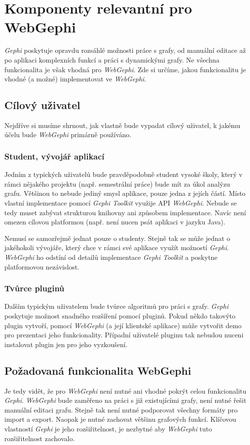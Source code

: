 \documentclass[thesis=M,czech]{FITthesis}[2014/05/6]
\begin{document}
\section{Komponenty relevantní pro WebGephi}
\textit{Gephi} poskytuje opravdu rozsáhlé možnosti práce s grafy, od manuální editace až po aplikaci komplexních funkcí a práci s dynamickými grafy.
Ne všechna funkcionalita je však vhodná pro \textit{WebGephi}. Zde si určíme, jakou funkcionalitu je vhodné (a možné) implementovat ve \textit{WebGephi}.

\subsection{Cílový uživatel}
Nejdříve si musíme shrnout, jak vlastně bude vypadat cílový uživatel, k jakému účelu bude \textit{WebGephi} primárně používáno.

\subsubsection{Student, vývojář aplikací}
Jedním z typických uživatelů bude pravděpodobně student vysoké školy, který v rámci nějakého projektu (např. semestrální práce) bude 
mít za úkol analýzu grafu. Většinou to nebude jediný smysl aplikace, pouze jedna z jejích částí. Místo vlastní implementace pomocí \textit{Gephi Toolkit}
využije API \textit{WebGephi}. Nebude se tedy muset zabývat strukturou knihovny ani způsobem implementace. Navíc není omezen
cílovou platformou (např. není nucen psát aplikaci v jazyku Java).

Nemusí se samozřejmě jednat pouze o studenty. Stejně tak se může jednat o jakéhokoli vývojáře, který chce v rámci své aplikace
využít možností \textit{Gephi}. \textit{WebGephi} ho odstíní od detailů implementace \textit{Gephi Toolkit} a poskytne platformovou nezávislost.

\subsubsection{Tvůrce pluginů}
Dalším typickým uživatelem bude tvůrce algoritmů pro práci s grafy. \textit{Gephi} poskytuje možnost snadného rozšíření pomocí pluginů.
Pokud někdo takovýto plugin vytvoří, pomocí \textit{WebGephi} (a její klientské aplikace) může vytvořit demo pro prezentaci jeho funkcionality. Případní 
uživatelé pluginu tak nebudou nuceni instalovat plugin jen pro jeho vyzkoušení.

\subsection{Požadovaná funkcionalita WebGephi}
Je tedy vidět, že pro \textit{WebGephi} není nutné ani vhodné pokrýt celou funkcionalitu \textit{Gephi}.
\textit{WebGephi} bude zaměřeno na práci s již existujícími grafy, není nutné řešit manuální editaci grafu. Stejně tak není nutné
podporovat všechny formáty pro import a export. Naopak je nutné zachovat většinu grafových funkcí. Klíčovou
vlastností \textit{Gephi} je jeho rozšiřitelnost, je nezbytné aby \textit{WebGephi} tuto rozšiřitelnost zachovalo.
\end{document}
